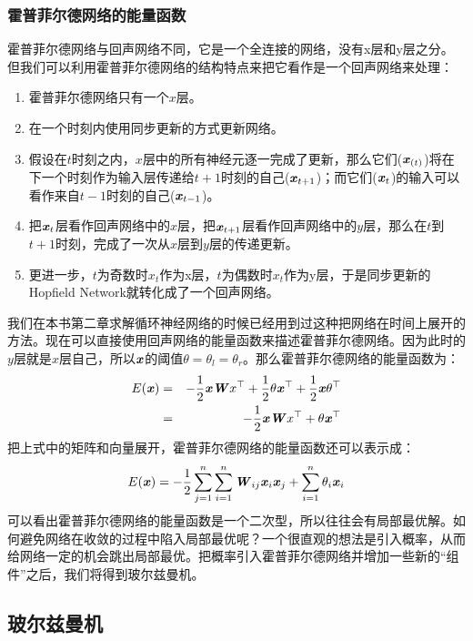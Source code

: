 \subsubsection{霍普菲尔德网络的能量函数}
霍普菲尔德网络与回声网络不同，它是一个全连接的网络，没有x层和y层之分。但我们可以利用霍普菲尔德网络的结构特点来把它看作是一个回声网络来处理：
\begin{enumerate}
	\setlength{\itemsep}{0pt}
    \setlength{\parsep}{0pt}
    \setlength{\parskip}{0pt}
	\item 霍普菲尔德网络只有一个$x$层。
	\item 在一个时刻内使用同步更新的方式更新网络。
	\item 假设在$t$时刻之内，$x$层中的所有神经元逐一完成了更新，那么它们($\boldsymbol{\mathit{x}}_{(t)}$)将在下一个时刻作为输入层传递给$t+1$时刻的自己($\boldsymbol{\mathit{x}}_{t+1}$)；而它们($\boldsymbol{\mathit{x}}_{t}$)的输入可以看作来自$t-1$时刻的自己($\boldsymbol{\mathit{x}}_{t-1}$)。
	\item 把$\boldsymbol{\mathit{x}}_{t}$层看作回声网络中的$x$层，把$\boldsymbol{\mathit{x}}_{t+1}$层看作回声网络中的$y$层，那么在$t$到$t+1$时刻，完成了一次从$x$层到$y$层的传递更新。
	\item 更进一步，$t$为奇数时$x_{t}$作为x层，$t$为偶数时$x_{t}$作为y层，于是同步更新的Hopfield Network就转化成了一个回声网络。
\end{enumerate}
我们在本书第二章求解循环神经网络的时候已经用到过这种把网络在时间上展开的方法。现在可以直接使用回声网络的能量函数来描述霍普菲尔德网络。因为此时的$y$层就是$x$层自己，所以$\boldsymbol{\mathit{x}}$的阈值${\theta}={\theta_{l}}={\theta_{r}}$。那么霍普菲尔德网络的能量函数为：
\begin{eqnarray}
E(\boldsymbol{\mathit{x}}) 
&=& -\frac{1}{2}\boldsymbol{\mathit{x}}\boldsymbol{\mathit{W}}{x}^\top + \frac{1}{2}{\theta}\boldsymbol{\mathit{x}}^\top + \frac{1}{2}\boldsymbol{\mathit{x}}{\theta}^\top\nonumber\\
&=& -\frac{1}{2}\boldsymbol{\mathit{x}}\boldsymbol{\mathit{W}}{x}^\top + {\theta}\boldsymbol{\mathit{x}}^\top
\end{eqnarray}
把上式中的矩阵和向量展开，霍普菲尔德网络的能量函数还可以表示成：
\begin{eqnarray}
E(\boldsymbol{\mathit{x}}) = -\frac{1}{2}\sum_{j=1}^{n}\sum_{i=1}^{n}\boldsymbol{\mathit{W}}_{ij}\boldsymbol{\mathit{x}}_{i}\boldsymbol{\mathit{x}}_{j} + \sum_{i=1}^{n}\theta_{i}\boldsymbol{\mathit{x}}_{i}
\end{eqnarray}
可以看出霍普菲尔德网络的能量函数是一个二次型，所以往往会有局部最优解。如何避免网络在收敛的过程中陷入局部最优呢？一个很直观的想法是引入概率，从而给网络一定的机会跳出局部最优。把概率引入霍普菲尔德网络并增加一些新的“组件”之后，我们将得到玻尔兹曼机。

\subsection{玻尔兹曼机}
